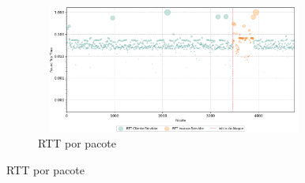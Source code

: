 \begin{apendicesenv}
\begin{figure}[htbp!]
    ~
    \begin{subfigure}[t]{0.5\textwidth}
        \centering
        \caption{RTT por pacote}
        \includegraphics[width=1\textwidth, height=120pt]{USPSC-img/output/cropped/2-dos_translate_browse_path_call_stack_overflow-rttp.png}
    \end{subfigure}%
\end{figure}


\end{apendicesenv}

